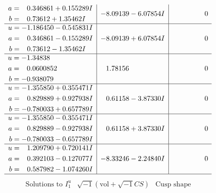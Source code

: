 \documentclass[1p]{elsarticle_modified}
\theoremstyle{definition}
\newcommand{\I}{\sqrt{-1}}
\begin{document}
$$\begin{array}{c|c|c}
\begin{aligned}
a &= \phantom{-}0.346861 + 0.155289 I \\
b &= \phantom{-}0.73612 + 1.35462 I\end{aligned}
 & -8.09139 - 6.07854 I & \phantom{-0.000000 } 0 \\ \hline\begin{aligned}
u &= -1.186450 - 0.545831 I \\
a &= \phantom{-}0.346861 - 0.155289 I \\
b &= \phantom{-}0.73612 - 1.35462 I\end{aligned}
 & -8.09139 + 6.07854 I & \phantom{-0.000000 } 0 \\ \hline\begin{aligned}
u &= -1.34838\phantom{ +0.000000I} \\
a &= \phantom{-}0.0600852\phantom{ +0.000000I} \\
b &= -0.938079\phantom{ +0.000000I}\end{aligned}
 & \phantom{-}1.78156\phantom{ +0.000000I} & \phantom{-0.000000 } 0 \\ \hline\begin{aligned}
u &= -1.355850 + 0.355471 I \\
a &= \phantom{-}0.829889 + 0.927938 I \\
b &= -0.780033 + 0.657789 I\end{aligned}
 & \phantom{-}0.61158 - 3.87330 I & \phantom{-0.000000 } 0 \\ \hline\begin{aligned}
u &= -1.355850 - 0.355471 I \\
a &= \phantom{-}0.829889 - 0.927938 I \\
b &= -0.780033 - 0.657789 I\end{aligned}
 & \phantom{-}0.61158 + 3.87330 I & \phantom{-0.000000 } 0 \\ \hline\begin{aligned}
u &= \phantom{-}1.209790 + 0.720141 I \\
a &= \phantom{-}0.392103 - 0.127077 I \\
b &= \phantom{-}0.587982 - 1.074260 I\end{aligned}
 & -8.33246 - 2.24840 I & \phantom{-0.000000 } 0\\
 \hline 
 \end{array}$$\newpage$$\begin{array}{c|c|c}  
\text{Solutions to }I^u_{1}& \I (\text{vol} + \sqrt{-1}CS) & \text{Cusp shape}\\
 \hline 
\begin{aligned}

\end{aligned}
\end{array}$$
\end{document}
